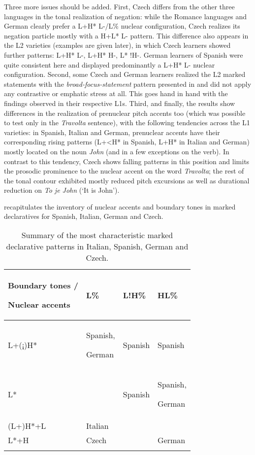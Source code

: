 Three more issues should be added. First, Czech differs from the other three languages in the tonal realization of negation: while the Romance languages and German clearly prefer a L+H* L-/L\% nuclear configuration, Czech realizes its negation particle mostly with a H+L* L- pattern. This difference also appears in the L2 varieties (examples are given later), in which Czech learners showed further patterns: L+H* L-, L+H* H-, L* !H-. German learners of Spanish were quite consistent here and displayed predominantly a L+H* L- nuclear configuration. Second, some Czech and German learners realized the L2 marked statements with the \textit{broad-focus-statement} pattern presented in  and did not apply any contrastive or emphatic stress at all. This goes hand in hand with the findings observed in their respective L1s. Third, and finally, the results show differences in the realization of prenuclear pitch accents too (which was possible to test only in the \textit{Travolta}{} sentence), with the following tendencies across the L1 varieties: in Spanish, Italian and German, prenuclear accents have their corresponding rising patterns (L+<H* in Spanish, L+H* in Italian and German) mostly located on the noun \textit{John} (and in a few exceptions on the verb). In contrast to this tendency, Czech shows falling patterns in this position and limits the prosodic prominence to the nuclear accent on the word \textit{Travolta}; the rest of the tonal contour exhibited mostly reduced pitch excursions as well as durational reduction on \textit{To je John} (‘It is John’).


 recapitulates the inventory of nuclear accents and boundary tones in marked declaratives for Spanish, Italian, German and Czech.

\begin{table}
\begin{tabularx}{\textwidth}{Qlll}

\lsptoprule

{Boundary tones /}

{Nuclear accents} & {L\%} & {L!H\%} & {HL\%}\\
\midrule
{L+(¡)H*} & Spanish,

German & Spanish & Spanish\\
{L*} &  & Spanish & Spanish,

German\\
{(L+)H*+L} & Italian &  & \\
{L*+H} & Czech &  & German\\
\lspbottomrule
\end{tabularx}

\caption{Summary of the most characteristic marked declarative patterns in Italian, Spanish, German and Czech.}
\label{tab:4.10}
\end{table}

